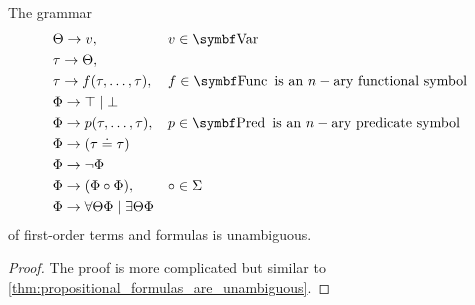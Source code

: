 \begin{proposition}\label{thm:first_order_formulas_are_unambiguous}
  The grammar
  \begin{equation*}
    \begin{aligned}
      &\Theta \to v,                                          && v \in \Cat{Var} \\
      &\tau \to \Theta,                                       && \\
      &\tau \to f(\tau, \ldots, \tau),                        && f \in \Cat{Func} \text{ is an } n-\text{ary functional symbol} \\
      &\Phi \to \top \;|\; \bot                               && \\
      &\Phi \to p(\tau, \ldots, \tau),                        && p \in \Cat{Pred} \text{ is an } n-\text{ary predicate symbol} \\
      &\Phi \to (\tau \doteq \tau)                            && \\
      &\Phi \to \neg \Phi                                     && \\
      &\Phi \to (\Phi \circ \Phi),                            && \circ \in \Sigma \\
      &\Phi \to \forall \Theta \Phi \;|\; \exists \Theta \Phi && \\
    \end{aligned}
  \end{equation*}
  of first-order terms and formulas is unambiguous.
\end{proposition}
\begin{proof}
  The proof is more complicated but similar to \cref{thm:propositional_formulas_are_unambiguous}.
\end{proof}

